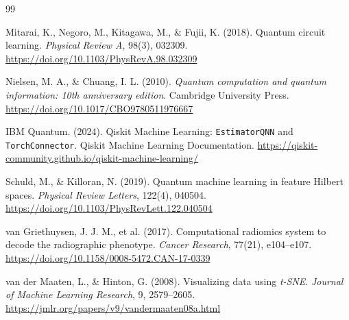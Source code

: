 \begin{thebibliography}{99}

    Mitarai, K., Negoro, M., Kitagawa, M., \& Fujii, K. (2018). Quantum circuit learning. \textit{Physical Review A}, 98(3), 032309. \url{https://doi.org/10.1103/PhysRevA.98.032309}


    Nielsen, M. A., \& Chuang, I. L. (2010). \textit{Quantum computation and quantum information: 10th anniversary edition}.
    Cambridge University Press. \url{https://doi.org/10.1017/CBO9780511976667}


    IBM Quantum. (2024). Qiskit Machine Learning: \texttt{EstimatorQNN} and \texttt{TorchConnector}. Qiskit Machine Learning Documentation. \url{https://qiskit-community.github.io/qiskit-machine-learning/}


    Schuld, M., \& Killoran, N. (2019). Quantum machine learning in feature {H}ilbert spaces.
    \textit{Physical Review Letters}, 122(4), 040504.
    \url{https://doi.org/10.1103/PhysRevLett.122.040504}


    van Griethuysen, J. J. M., et al. (2017). Computational radiomics system to decode the radiographic phenotype.
    \textit{Cancer Research}, 77(21), e104--e107.
    \url{https://doi.org/10.1158/0008-5472.CAN-17-0339}


    van der Maaten, L., \& Hinton, G. (2008). Visualizing data using \textit{t-SNE}.
    \textit{Journal of Machine Learning Research}, 9, 2579--2605.
    \url{https://jmlr.org/papers/v9/vandermaaten08a.html}

\end{thebibliography}
